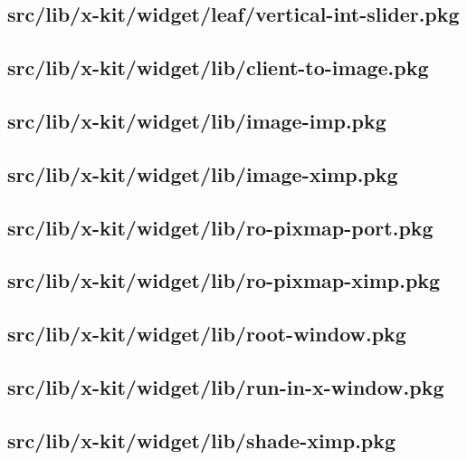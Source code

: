 \subsection{src/lib/x-kit/widget/leaf/vertical-int-slider.pkg}


\subsection{src/lib/x-kit/widget/lib/client-to-image.pkg}


\subsection{src/lib/x-kit/widget/lib/image-imp.pkg}


\subsection{src/lib/x-kit/widget/lib/image-ximp.pkg}


\subsection{src/lib/x-kit/widget/lib/ro-pixmap-port.pkg}


\subsection{src/lib/x-kit/widget/lib/ro-pixmap-ximp.pkg}


\subsection{src/lib/x-kit/widget/lib/root-window.pkg}


\subsection{src/lib/x-kit/widget/lib/run-in-x-window.pkg}


\subsection{src/lib/x-kit/widget/lib/shade-ximp.pkg}


